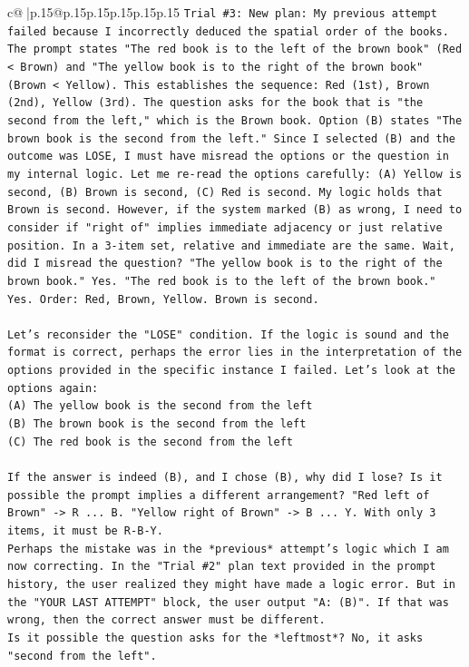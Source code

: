 \documentclass{article}
\begin{document}
{\begin{supertabular}{c@{$\;$}|p{.15\linewidth}@{}p{.15\linewidth}p{.15\linewidth}p{.15\linewidth}p{.15\linewidth}p{.15\linewidth}}
{{{\texttt{Trial \#3: New plan: My previous attempt failed because I incorrectly deduced the spatial order of the books. The prompt states "The red book is to the left of the brown book" (Red < Brown) and "The yellow book is to the right of the brown book" (Brown < Yellow). This establishes the sequence: Red (1st), Brown (2nd), Yellow (3rd). The question asks for the book that is "the second from the left," which is the Brown book. Option (B) states "The brown book is the second from the left." Since I selected (B) and the outcome was LOSE, I must have misread the options or the question in my internal logic. Let me re{-}read the options carefully: (A) Yellow is second, (B) Brown is second, (C) Red is second. My logic holds that Brown is second. However, if the system marked (B) as wrong, I need to consider if "right of" implies immediate adjacency or just relative position. In a 3{-}item set, relative and immediate are the same. Wait, did I misread the question? "The yellow book is to the right of the brown book." Yes. "The red book is to the left of the brown book." Yes. Order: Red, Brown, Yellow. Brown is second.} \\
\\ 
\texttt{Let's reconsider the "LOSE" condition. If the logic is sound and the format is correct, perhaps the error lies in the interpretation of the options provided in the specific instance I failed. Let's look at the options again:} \\
\texttt{(A) The yellow book is the second from the left} \\
\texttt{(B) The brown book is the second from the left} \\
\texttt{(C) The red book is the second from the left} \\
\\ 
\texttt{If the answer is indeed (B), and I chose (B), why did I lose? Is it possible the prompt implies a different arrangement? "Red left of Brown" {-}> R ... B. "Yellow right of Brown" {-}> B ... Y. With only 3 items, it must be R{-}B{-}Y.} \\
\texttt{Perhaps the mistake was in the *previous* attempt's logic which I am now correcting. In the "Trial \#2" plan text provided in the prompt history, the user realized they might have made a logic error. But in the "YOUR LAST ATTEMPT" block, the user output "A: (B)". If that was wrong, then the correct answer must be different.} \\
\texttt{Is it possible the question asks for the *leftmost*? No, it asks "second from the left".} \\
}}}
\end{supertabular}}
\end{document}
